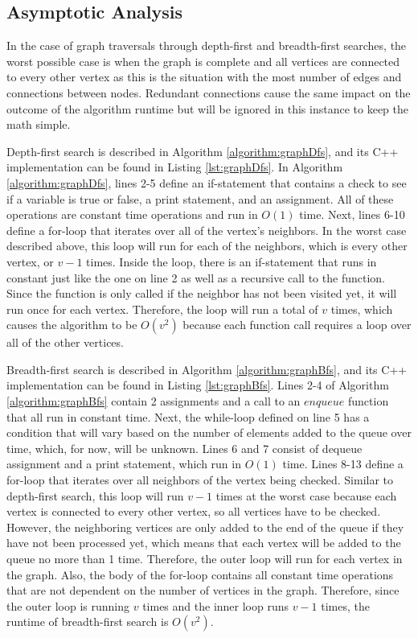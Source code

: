 \documentclass[letterpaper, 10pt,DIV=13]{scrartcl}
\numberwithin{equation}{section} %
\numberwithin{figure}{section} %
\numberwithin{table}{section} %
\begin{document}
\subsection{Asymptotic Analysis}
In the case of graph traversals through depth-first and breadth-first searches, the worst possible case is when the graph is complete and all vertices are connected to every other vertex as this is the situation with the most number of edges and connections between nodes. Redundant connections cause the same impact on the outcome of the algorithm runtime but will be ignored in this instance to keep the math simple.

Depth-first search is described in Algorithm \ref{algorithm:graphDfs}, and its C++ implementation can be found in Listing \ref{lst:graphDfs}. In Algorithm \ref{algorithm:graphDfs}, lines 2-5 define an if-statement that contains a check to see if a variable is true or false, a print statement, and an assignment. All of these operations are constant time operations and run in $O(1)$ time. Next, lines 6-10 define a for-loop that iterates over all of the vertex's neighbors. In the worst case described above, this loop will run for each of the neighbors, which is every other vertex, or $v - 1$ times. Inside the loop, there is an if-statement that runs in constant just like the one on line 2 as well as a recursive call to the function. Since the function is only called if the neighbor has not been visited yet, it will run once for each vertex. Therefore, the loop will run a total of $v$ times, which causes the algorithm to be $O(v^2)$ because each function call requires a loop over all of the other vertices.

Breadth-first search is described in Algorithm \ref{algorithm:graphBfs}, and its C++ implementation can be found in Listing \ref{lst:graphBfs}. Lines 2-4 of Algorithm \ref{algorithm:graphBfs} contain 2 assignments and a call to an $enqueue$ function that all run in constant time. Next, the while-loop defined on line 5 has a condition that will vary based on the number of elements added to the queue over time, which, for now, will be unknown. Lines 6 and 7 consist of dequeue assignment and a print statement, which run in $O(1)$ time. Lines 8-13 define a for-loop that iterates over all neighbors of the vertex being checked. Similar to depth-first search, this loop will run $v - 1$ times at the worst case because each vertex is connected to every other vertex, so all vertices have to be checked. However, the neighboring vertices are only added to the end of the queue if they have not been processed yet, which means that each vertex will be added to the queue no more than 1 time. Therefore, the outer loop will run for each vertex in the graph. Also, the body of the for-loop contains all constant time operations that are not dependent on the number of vertices in the graph. Therefore, since the outer loop is running $v$ times and the inner loop runs $v - 1$ times, the runtime of breadth-first search is $O(v^2)$.
\end{document}

